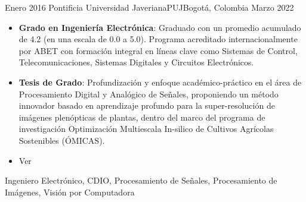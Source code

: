 %
%
%
\begin{experiences}
  \experience
    {Enero 2016} {Pontificia Universidad Javeriana}{PUJ}{Bogotá, Colombia}
    {Marzo 2022}    {
                      \begin{itemize}
                        \item \textbf{Grado en Ingeniería Electrónica}: Graduado con un promedio acumulado de 4.2 (en una escala de 0.0 a 5.0). Programa acreditado internacionalmente por ABET con formación integral en líneas clave como Sistemas de Control, Telecomunicaciones, Sistemas Digitales y Circuitos Electrónicos.
                        \item \textbf{Tesis de Grado}: Profundización y enfoque académico-práctico en el área de Procesamiento Digital y Analógico de Señales, proponiendo un método innovador basado en aprendizaje profundo para la super-resolución de imágenes plenópticas de plantas, dentro del marco del programa de investigación Optimización Multiescala In-silico de Cultivos Agrícolas Sostenibles (ÓMICAS).
                        \item Ver \href{https://wallet.xertify.co/certificates/E8381125A001}{\color{CadetBlue}{Certificado (Insignia Digital)}}
                      \end{itemize}
                    }
                    {Ingeniero Electrónico, CDIO, Procesamiento de Señales, Procesamiento de Imágenes, Visión por Computadora}


\end{experiences}
